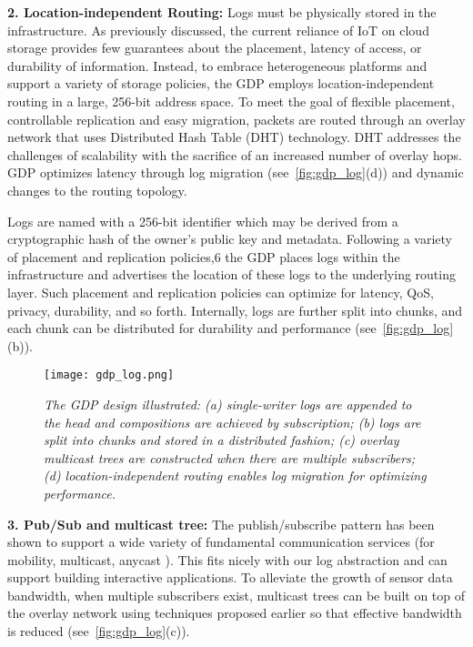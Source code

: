 \textbf{2. Location-independent Routing:} Logs must be physically
stored in the infrastructure. As previously discussed,
the current reliance of IoT on cloud storage provides
few guarantees about the placement, latency of access,
or durability of information. Instead, to embrace heterogeneous
platforms and support a variety of storage
policies, the GDP employs location-independent routing
in a large, 256-bit address space. To meet the goal of
flexible placement, controllable replication and easy migration,
packets are routed through an overlay network
that uses Distributed Hash Table (DHT) technology. DHT
addresses the challenges of scalability \cite{pastry, chord, tapestry} with
the sacrifice of an increased number of overlay hops. GDP
optimizes latency through log migration (see~\autoref{fig:gdp_log}(d))
and dynamic changes to the routing topology.

Logs are named with a 256-bit identifier which may be
derived from a cryptographic hash of the owner’s public
key and metadata. Following a variety of placement and
replication policies,6
the GDP places logs within the infrastructure
and advertises the location of these logs to the
underlying routing layer. Such placement and replication
policies can optimize for latency, QoS, privacy, durability,
and so forth. Internally, logs are further split into chunks,
and each chunk can be distributed for durability \cite{oceanstore} and
performance \cite{bolt} (see~\autoref{fig:gdp_log}(b)).

\begin{figure}[t]
	\begin{center}
		\texttt{[image: gdp\_log.png]}
	\end{center}
	\vspace{-1.3em}
	\caption{\small \itshape  The GDP design illustrated: (a) single-writer logs are appended to the head and compositions are achieved by subscription;
		(b) logs are split into chunks and stored in a distributed fashion; (c) overlay multicast trees are constructed when there are multiple
		subscribers; (d) location-independent routing enables log migration for optimizing performance.}
	\vspace{-1em}
	\label{fig:gdp_log}
\end{figure}

\textbf{3. Pub/Sub and multicast tree:} The publish/subscribe
pattern has been shown to support a wide variety of fundamental
communication services (for mobility, multicast,
anycast \cite{indirection}). This fits nicely with our log abstraction
and can support building interactive applications. To
alleviate the growth of sensor data bandwidth, when multiple
subscribers exist, multicast trees can be built on top
of the overlay network using techniques proposed earlier \cite{cbt, tapestry} so that effective bandwidth is reduced \cite{end-system-mc} 
(see~\autoref{fig:gdp_log}(c)).

